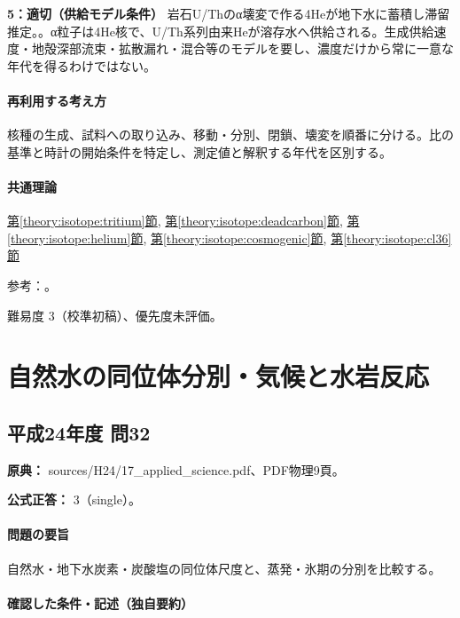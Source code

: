 \noindent\textbf{5：適切（供給モデル条件）} 岩石U/Thのα壊変で作る4Heが地下水に蓄積し滞留推定。。α粒子は4He核で、U/Th系列由来Heが溶存水へ供給される。生成供給速度・地殻深部流束・拡散漏れ・混合等のモデルを要し、濃度だけから常に一意な年代を得るわけではない。\par

\paragraph{再利用する考え方} 核種の生成、試料への取り込み、移動・分別、閉鎖、壊変を順番に分ける。比の基準と時計の開始条件を特定し、測定値と解釈する年代を区別する。

\paragraph{共通理論} \hyperref[theory:isotope:tritium]{第\ref*{theory:isotope:tritium}節}, \hyperref[theory:isotope:deadcarbon]{第\ref*{theory:isotope:deadcarbon}節}, \hyperref[theory:isotope:helium]{第\ref*{theory:isotope:helium}節}, \hyperref[theory:isotope:cosmogenic]{第\ref*{theory:isotope:cosmogenic}節}, \hyperref[theory:isotope:cl36]{第\ref*{theory:isotope:cl36}節}

\par 参考：\cite{iso_tritium_clock,iso_groundwater,iso_deadcarbon,iso_be10,iso_cl36,iso_cl36_uw}。

\par 難易度 3（校準初稿）、優先度未評価。

\section{自然水の同位体分別・気候と水岩反応}

\subsection{平成24年度 問32}
\label{q:h24-reg-applied-32}

\noindent\textbf{原典：} sources/H24/17\_applied\_science.pdf、PDF物理9頁。

\textbf{公式正答：} 3（single）。

\paragraph{問題の要旨} 自然水・地下水炭素・炭酸塩の同位体尺度と、蒸発・氷期の分別を比較する。

\paragraph{確認した条件・記述（独自要約）}\mbox{}\par


